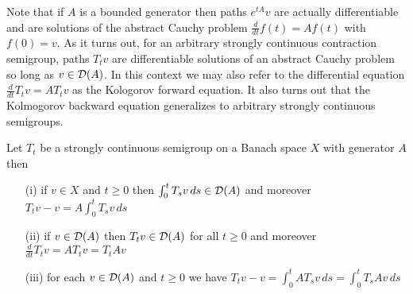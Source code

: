 Note that if $A$ is a bounded generator then paths $e^{tA}v$ are actually differentiable and are solutions of the abstract Cauchy problem $\frac{d}{dt} f(t) = A f(t)$ with $f(0) = v$.   As it turns out, for an arbitrary strongly continuous contraction semigroup, paths $T_t v$ are differentiable solutions of an abstract Cauchy problem so long as $v \in \mathcal{D}(A)$.  In this context we may also refer to the differential equation $\frac{d}{dt} T_t v = A T_t v$  as the Kologorov forward equation.  
It also turns out that the Kolmogorov backward equation generalizes to arbitrary strongly continuous semigroups.
\begin{prop}\label{StronglyContinuousSemigroupKolomgorovBackwardEquation}Let $T_t$ be a strongly continuous semigroup on a Banach  space $X$ with generator $A$ then 
\begin{itemize}
\item[(i)] if $v \in X$ and $t \geq 0$ then $\int_0^t T_s v \, ds \in \mathcal{D}(A)$ and moreover $T_t v - v = A \int_0^t T_sv \, ds$
\item[(ii)] if $v \in \mathcal{D}(A)$ then $T_t v \in \mathcal{D}(A)$ for all $t \geq 0$ and moreover $\frac{d}{dt} T_t v = A T_t v = T_t A v$
\item[(iii)] for each $v \in \mathcal{D}(A)$ and $t \geq 0$ we have $T_t v - v = \int_0^t A T_sv \, ds = \int_0^t T_s A v \, ds$
\end{itemize}
\end{prop}

